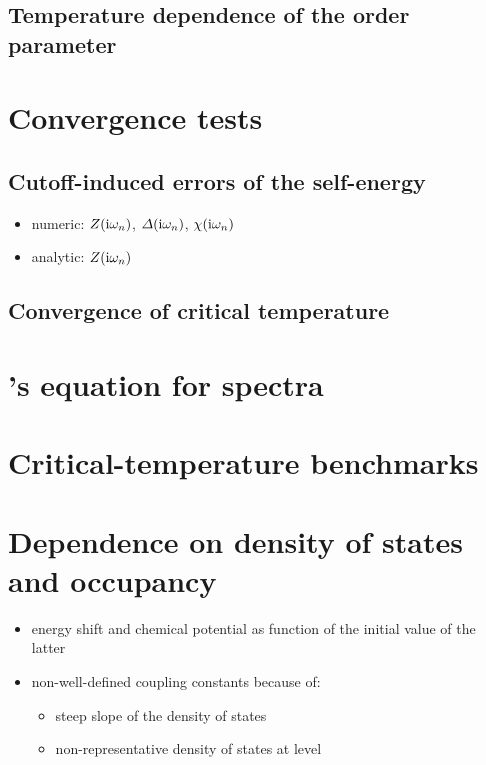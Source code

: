 \subsection{Temperature dependence of the order parameter}

\section{Convergence tests}

\subsection{Cutoff-induced errors of the self-energy}

\begin{itemize}
    \item numeric: $Z(\mathrm i \omega_n)$, $\varDelta(\mathrm i \omega_n)$, $\chi(\mathrm i \omega_n)$
    \item analytic: $Z(\mathrm i \omega_n)$
\end{itemize}

\subsection{Convergence of critical temperature}

\section{'s equation for  spectra}

\section{Critical-temperature benchmarks}

\section{Dependence on density of states and occupancy}

\begin{itemize}
    \item energy shift and chemical potential as function of the initial value
          of the latter
    \item non-well-defined coupling constants because of:
    \begin{itemize}
        \item steep slope of the density of states
        \item non-representative density of states at  level
    \end{itemize}
\end{itemize}

